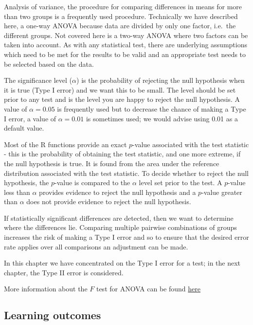 \documentclass[
  oneside]{krantz}
\begin{document}
Analysis of variance, the procedure for comparing differences in means for more than two groups is a frequently used procedure. Technically we have described here, a one-way ANOVA because data are divided by only one factor, i.e.~the different groups. Not covered here is a two-way ANOVA where two factors can be taken into account. As with any statistical test, there are underlying assumptions which need to be met for the results to be valid and an appropriate test needs to be selected based on the data.

The significance level (\(\alpha\)) is the probability of rejecting the null hypothesis when it is true (Type I error) and we want this to be small. The level should be set prior to any test and is the level you are happy to reject the null hypothesis. A value of \(\alpha=0.05\) is frequently used but to decrease the chance of making a Type I error, a value of \(\alpha=0.01\) is sometimes used; we would advise using 0.01 as a default value.

Most of the R functions provide an exact \(p\)-value associated with the test statistic - this is the probability of obtaining the test statistic, and one more extreme, if the null hypothesis is true. It is found from the area under the reference distribution associated with the test statistic. To decide whether to reject the null hypothesis, the \(p\)-value is compared to the \(\alpha\) level set prior to the test. A \(p\)-value less than \(\alpha\) provides evidence to reject the null hypothesis and a \(p\)-value greater than \(\alpha\) does not provide evidence to reject the null hypothesis.

If statistically significant differences are detected, then we want to determine where the differences lie. Comparing multiple pairwise combinations of groups increases the risk of making a Type I error and so to ensure that the desired error rate applies over all comparisons an adjustment can be made.

In this chapter we have concentrated on the Type I error for a test; in the next chapter, the Type II error is considered.

More information about the \(F\) test for ANOVA can be found \href{https://www.khanacademy.org/math/probability/statistics-inferential/anova/v/anova-3-hypothesis-test-with-f-statistic}{here}

\hypertarget{learning-outcomes-5}{%
\subsection{Learning outcomes}\label{learning-outcomes-5}}
\end{document}
